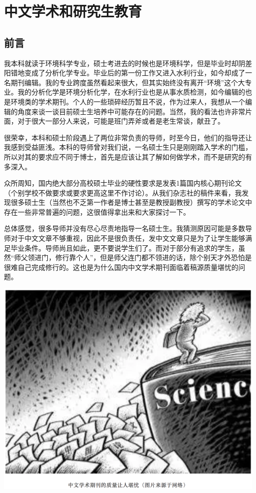 \documentclass[]{book}
\begin{document}
\section{中文学术和研究生教育}

\subsection{前言}\label{-4}

我本科就读于环境科学专业，硕士考进去的时候也是环境科学，但是毕业时却阴差阳错地变成了分析化学专业。毕业后的第一份工作又进入水利行业，如今却成了一名期刊编辑。我的专业跨度虽然看起来很大，但其实始终没有离开``环境''这个大专业。我的分析化学是环境分析化学，在水利行业也是从事水质检测，如今编辑的也是环境类的学术期刊。个人的一些琐碎经历暂且不说，作为过来人，我想从一个编辑的角度来谈一谈目前硕士生培养中可能存在的问题。当然，我的看法也许非常片面，对于很大一部分人来说，可能是班门弄斧或者是老生常谈，献丑了。

很荣幸，本科和硕士阶段遇上了两位非常负责的导师，时至今日，他们的指导还让我感到受益匪浅。本科的导师曾对我们说，一名硕士生只是刚刚踏入学术的门槛，所以对其的要求应不同于博士，首先是应该让其了解如何做学术，而不是研究的有多深入。

众所周知，国内绝大部分高校硕士毕业的硬性要求是发表1篇国内核心期刊论文（个别学校不做要求或要求更高这里不作讨论）。从我们杂志社的稿件来看，我发现很多硕士生（当然也不乏第一作者是博士甚至是教授副教授）撰写的学术论文中存在一些非常普遍的问题，这很值得拿出来和大家探讨一下。

总体感觉，很多导师并没有尽心尽责地指导一名硕士生。我猜测原因可能是多数导师对于中文文章不够重视，因此不是很负责任，发中文文章只是为了让学生能够满足毕业条件。导师尚且如此，更不要说学生们了。而对于部分有追求的学生，虽然``师父领进门，修行靠个人''，但是师父连门都不领进的话，除个别天才外恐怕是很难自己完成修行的。这也是为什么国内中文学术期刊面临着稿源质量堪忧的问题。

\includegraphics[width=8.33in]{images/edit1}
\end{document}
